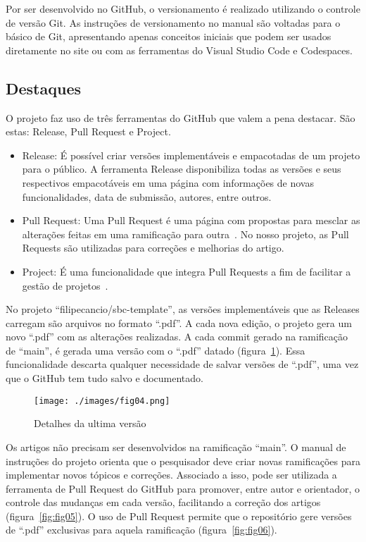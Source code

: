 Por ser desenvolvido no GitHub, o versionamento é realizado utilizando o controle de versão Git. As instruções de versionamento no manual são voltadas para o básico de Git, apresentando apenas conceitos iniciais que podem ser usados diretamente no site ou com as ferramentas do Visual Studio Code e Codespaces.

\subsection{Destaques}
O projeto faz uso de três ferramentas do GitHub que valem a pena destacar. São estas: Release, Pull Request e Project.
\begin{itemize}
	\item Release: É possível criar versões implementáveis e empacotadas de um projeto para o público. A ferramenta Release disponibiliza todas as versões e seus respectivos empacotáveis em uma página com informações de novas funcionalidades, data de submissão, autores, entre outros.~\cite{github:03}
	\item Pull Request: Uma Pull Request é uma página com propostas para mesclar as alterações feitas em uma ramificação para outra~\cite{github:04}. No nosso projeto, as Pull Requests são utilizadas para correções e melhorias do artigo.
	\item Project: É uma funcionalidade que integra Pull Requests a fim de facilitar a gestão de projetos~\cite{github:05}.
\end{itemize}


No projeto ``filipecancio/sbc-template'', as versões implementáveis que as Releases carregam são arquivos no formato ``.pdf''. A cada nova edição, o projeto gera um novo ``.pdf'' com as alterações realizadas. A cada commit gerado na ramificação de ``main'', é gerada uma versão com o ``.pdf'' datado (figura~\ref{fig:fig04}). Essa funcionalidade descarta qualquer necessidade de salvar versões de ``.pdf'', uma vez que o GitHub tem tudo salvo e documentado.
\begin{figure}[H]
	\centering
	\texttt{[image: ./images/fig04.png]}
	\caption{Detalhes da ultima versão}
	\label{fig:fig04}
\end{figure}

Os artigos não precisam ser desenvolvidos na ramificação ``main''. O manual de instruções do projeto orienta que o pesquisador deve criar novas ramificações para implementar novos tópicos e correções. Associado a isso, pode ser utilizada a ferramenta de Pull Request do GitHub para promover, entre autor e orientador, o controle das mudanças em cada versão, facilitando a correção dos artigos (figura~\ref{fig:fig05}). O uso de Pull Request permite que o repositório gere versões de ``.pdf'' exclusivas para aquela ramificação (figura~\ref{fig:fig06}).

